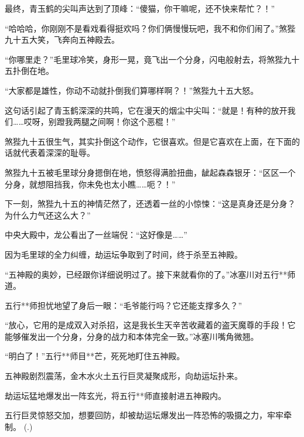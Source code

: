 \begin{this_body}
最终，青玉鹤的尖叫声达到了顶峰：“傻猫，你干嘛呢，还不快来帮忙？！”

“哈哈哈，你刚刚不是看戏看得挺欢吗？你们俩慢慢玩吧，我不和你们闹了。”煞狴九十五大笑，飞奔向五神殿去。

“你哪里走？”毛里球冷笑，身形一晃，竟飞出一个分身，闪电般射去，将煞狴九十五扑倒在地。

“大家都是雄性，你动不动就扑倒我们算哪样啊？！”煞狴九十五大怒。

这句话引起了青玉鹤深深的共鸣，它在漫天的烟尘中尖叫：“就是！有种的放开我们……哎呀，别蹬我两腿之间啊！你这个恶棍！”

煞狴九十五很生气，其实扑倒这个动作，它很喜欢。但是它喜欢在上面，在下面的话就代表着深深的耻辱。

煞狴九十五被毛里球分身摁倒在地，愤怒得满脸扭曲，龇起森森银牙：“区区一个分身，就想阻挡我，你未免也太小瞧……呃？！”

下一刻，煞狴九十五的神情茫然了，还透着一丝的小惊悚：“这是真身还是分身？为什么力气还这么大？”

中央大殿中，龙公看出了一丝端倪：“这好像是……”

因为毛里球的全力纠缠，劫运坛争取到了时间，终于杀至五神殿。

“五神殿的奥妙，已经跟你详细说明过了。接下来就看你的了。”冰塞川对五行**师道。

五行**师担忧地望了身后一眼：“毛爷能行吗？它还能支撑多久？”

“放心，它用的是成双入对杀招，这是我长生天辛苦收藏着的盗天魔尊的手段！它能够催发出一个分身，分身的战力和本体完全一致。”冰塞川嘴角微翘。

“明白了！”五行**师目**芒，死死地盯住五神殿。

五神殿剧烈震荡，金木水火土五行巨灵凝聚成形，向劫运坛扑来。

劫运坛猛地爆发出一阵玄光，将五行**师直接射进五神殿内。

五行巨灵惊怒交加，想要回防，却被劫运坛爆发出一阵恐怖的吸摄之力，牢牢牵制。	 (.)

\end{this_body}

